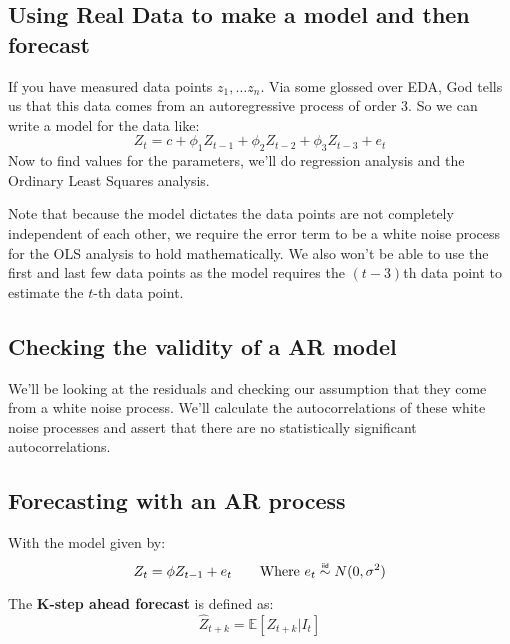 \subsection{Using Real Data to make a model and then forecast}
If you have measured data points $z_{1}, \dots z_{n}$. Via some glossed over
EDA, God tells us that this data comes from an autoregressive process of order
3. So we can write a model for the data like:
\begin{equation*}
    Z_{t} = c + \phi_{1}Z_{t-1} + \phi_{2}Z_{t-2} + \phi_{3}Z_{t-3} + e_{t}
\end{equation*}
Now to find values for the parameters, we'll do regression analysis and the
Ordinary Least Squares analysis. 

Note that because the model dictates the data points are not completely
independent of each other, we require the error term to be a white noise
process for the OLS analysis to hold mathematically. We also won't be able to
use the first and last few data points as the model requires the $(t-3)$th data
point to estimate the $t$-th data point.


\subsection{Checking the validity of a AR model}
We'll be looking at the residuals and checking our assumption that they come
from a white noise process. We'll calculate the autocorrelations of these white
noise processes and assert that there are no statistically significant
autocorrelations.

\subsection{Forecasting with an AR process}
With the model given by:
\begin{equation*}
    Z_{t} = \phi Z_{t-1} + e_{t} \qquad \text{Where $e_t \iid N(0, \sigma^2)$}
\end{equation*}

The \textbf{K-step ahead forecast} is defined as:
\begin{equation*}
    \hat{Z}_{t+k} = \mathbb{E}\left[Z_{t+k} | I_{t}\right] 
\end{equation*}
